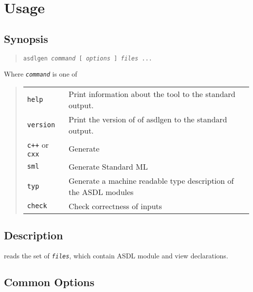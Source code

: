 %
\chapter{Usage}
\label{chap:usage}

\section*{Synopsis}
\begin{quote}
  \texttt{asdlgen \textit{command} [ \textit{options} ] \textit{files} ...}
\end{quote}%
%
Where \texttt{\textit{command}} is one of
\begin{quote}
  \begin{tabular}{ll}
    \texttt{help}
      & Print information about the \asdlgen{} tool to the standard output. \\
    \texttt{version}
      & Print the version of of asdlgen to the standard output. \\
    \texttt{c++} or \texttt{cxx}
      & Generate \Cplusplus{} \\
    \texttt{sml}
      & Generate Standard ML \\
    \texttt{typ}
      & Generate a machine readable type description of the ASDL modules \\
    \texttt{check}
      & Check correctness of inputs \\
  \end{tabular}%
\end{quote}%

\section*{Description}
\asdlgen{} reads the set of \texttt{\textit{files}}, which contain ASDL module
and view declarations.

\section*{Common Options}

